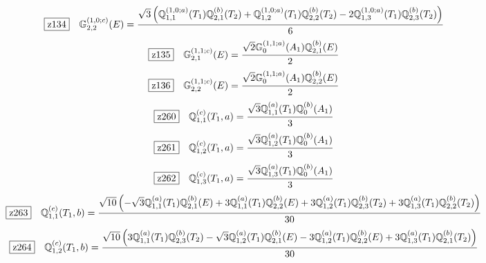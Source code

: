 \documentclass[fleqn,10pt,landscape]{jsarticle}
\begin{document}
\begin{dmath*}
\hspace*{3mm}\fbox{z134}\quad \mathbb{G}_{2,2}^{(1,0;c)}(E)=\frac{\sqrt{3} \left(\mathbb{Q}_{1,1}^{(1,0;a)}(T_{1}) \mathbb{Q}_{2,1}^{(b)}(T_{2}) + \mathbb{Q}_{1,2}^{(1,0;a)}(T_{1}) \mathbb{Q}_{2,2}^{(b)}(T_{2}) - 2 \mathbb{Q}_{1,3}^{(1,0;a)}(T_{1}) \mathbb{Q}_{2,3}^{(b)}(T_{2})\right)}{6}
\end{dmath*}
\begin{dmath*}
\hspace*{3mm}\fbox{z135}\quad \mathbb{G}_{2,1}^{(1,1;c)}(E)=\frac{\sqrt{2} \mathbb{G}_{0}^{(1,1;a)}(A_{1}) \mathbb{Q}_{2,1}^{(b)}(E)}{2}
\end{dmath*}
\begin{dmath*}
\hspace*{3mm}\fbox{z136}\quad \mathbb{G}_{2,2}^{(1,1;c)}(E)=\frac{\sqrt{2} \mathbb{G}_{0}^{(1,1;a)}(A_{1}) \mathbb{Q}_{2,2}^{(b)}(E)}{2}
\end{dmath*}
\begin{dmath*}
\hspace*{3mm}\fbox{z260}\quad \mathbb{Q}_{1,1}^{(c)}(T_{1},a)=\frac{\sqrt{3} \mathbb{Q}_{1,1}^{(a)}(T_{1}) \mathbb{Q}_{0}^{(b)}(A_{1})}{3}
\end{dmath*}
\begin{dmath*}
\hspace*{3mm}\fbox{z261}\quad \mathbb{Q}_{1,2}^{(c)}(T_{1},a)=\frac{\sqrt{3} \mathbb{Q}_{1,2}^{(a)}(T_{1}) \mathbb{Q}_{0}^{(b)}(A_{1})}{3}
\end{dmath*}
\begin{dmath*}
\hspace*{3mm}\fbox{z262}\quad \mathbb{Q}_{1,3}^{(c)}(T_{1},a)=\frac{\sqrt{3} \mathbb{Q}_{1,3}^{(a)}(T_{1}) \mathbb{Q}_{0}^{(b)}(A_{1})}{3}
\end{dmath*}
\begin{dmath*}
\hspace*{3mm}\fbox{z263}\quad \mathbb{Q}_{1,1}^{(c)}(T_{1},b)=\frac{\sqrt{10} \left(- \sqrt{3} \mathbb{Q}_{1,1}^{(a)}(T_{1}) \mathbb{Q}_{2,1}^{(b)}(E) + 3 \mathbb{Q}_{1,1}^{(a)}(T_{1}) \mathbb{Q}_{2,2}^{(b)}(E) + 3 \mathbb{Q}_{1,2}^{(a)}(T_{1}) \mathbb{Q}_{2,3}^{(b)}(T_{2}) + 3 \mathbb{Q}_{1,3}^{(a)}(T_{1}) \mathbb{Q}_{2,2}^{(b)}(T_{2})\right)}{30}
\end{dmath*}
\begin{dmath*}
\hspace*{3mm}\fbox{z264}\quad \mathbb{Q}_{1,2}^{(c)}(T_{1},b)=\frac{\sqrt{10} \left(3 \mathbb{Q}_{1,1}^{(a)}(T_{1}) \mathbb{Q}_{2,3}^{(b)}(T_{2}) - \sqrt{3} \mathbb{Q}_{1,2}^{(a)}(T_{1}) \mathbb{Q}_{2,1}^{(b)}(E) - 3 \mathbb{Q}_{1,2}^{(a)}(T_{1}) \mathbb{Q}_{2,2}^{(b)}(E) + 3 \mathbb{Q}_{1,3}^{(a)}(T_{1}) \mathbb{Q}_{2,1}^{(b)}(T_{2})\right)}{30}
\end{dmath*}
\end{document}
